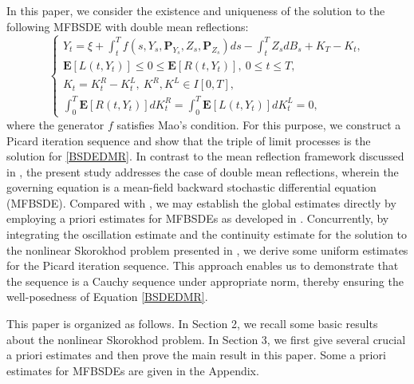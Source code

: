 \documentclass[10pt]{article}%
\numberwithin{equation}{section}
\def \P{\mathbf{P}}
\begin{document}
In this paper, we consider the existence and uniqueness of the solution to the following MFBSDE with double mean reflections:
\begin{equation}\label{BSDEDMR}
\begin{cases}
Y_t=\xi+\int_t^T f(s,Y_s,\P_{Y_s},Z_s,\P_{Z_s})ds-\int_t^T Z_s dB_s+K_T-K_t,\\
\mathbf{E}[L(t,Y_t)]\leq 0\leq \mathbf{E}[R(t,Y_t)], \ 0\leq t\leq T, \\
K_t=K^R_t-K^L_t,\ K^R,K^L\in I[0,T], \\
\int_0^T \mathbf{E}[R(t,Y_t)]dK_t^R=\int_0^T \mathbf{E}[L(t,Y_t)]dK^L_t=0,
\end{cases}
\end{equation}
where the generator $f$ satisfies Mao's condition. For this purpose, we construct a Picard iteration sequence and show that the triple of limit processes is the solution for \eqref{BSDEDMR}. In contrast to the mean reflection framework discussed in \cite{CZ}, the present study addresses the case of double mean reflections, wherein the governing equation is a mean-field backward stochastic differential equation (MFBSDE). Compared with \cite{CZ}, we may establish the global estimates directly by employing a priori estimates for MFBSDEs as developed in \cite{LLZ}. Concurrently, by integrating the oscillation estimate and the continuity estimate for the solution to the nonlinear Skorokhod problem presented in \cite{Li}, we derive some uniform estimates for the Picard iteration sequence. This approach enables us to demonstrate that the sequence is a Cauchy sequence under appropriate norm, thereby ensuring the well-posedness of Equation \eqref{BSDEDMR}.

This paper is organized as follows. In Section 2, we recall some basic results about the nonlinear Skorokhod problem. In Section 3, we first give several crucial a priori estimates and then prove the main result in this paper. Some a priori estimates for MFBSDEs are given in the Appendix.
\end{document}
